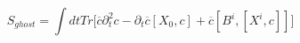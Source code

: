 \begin{equation}
S_{ghost}=\int dt Tr \Bigg [ \overline{c} \partial_t^2 c - \partial_t
\overline{c}[X_0, c] +  \overline{c}[B^i, [X^i, c]] \Bigg]
\end{equation}


